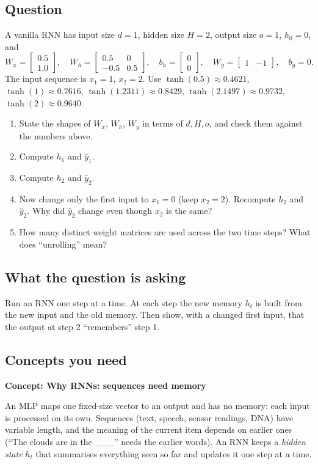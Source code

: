 \documentclass[12pt,a4paper]{article}
\newcommand{\concept}[2]{\par\medskip\phantomsection\label{#1}{\large\bfseries\color{blue!50!black} Concept: #2}\par}
\begin{document}
\subsection*{Question}
A vanilla RNN has input size $d=1$, hidden size $H=2$, output size $o=1$, $h_0=0$, and
\[
W_x=\begin{bmatrix}0.5\\1.0\end{bmatrix},\quad W_h=\begin{bmatrix}0.5&0\\-0.5&0.5\end{bmatrix},\quad b_h=\begin{bmatrix}0\\0\end{bmatrix},\quad W_y=\begin{bmatrix}1&-1\end{bmatrix},\quad b_y=0 .
\]
The input sequence is $x_1=1$, $x_2=2$. Use $\tanh(0.5)\approx0.4621$, $\tanh(1)\approx0.7616$, $\tanh(1.2311)\approx0.8429$, $\tanh(2.1497)\approx0.9732$, $\tanh(2)\approx0.9640$.
\begin{enumerate}[label=(\alph*)]
\item State the shapes of $W_x$, $W_h$, $W_y$ in terms of $d,H,o$, and check them against the numbers above.
\item Compute $h_1$ and $\hat y_1$.
\item Compute $h_2$ and $\hat y_2$.
\item Now change only the first input to $x_1=0$ (keep $x_2=2$). Recompute $h_2$ and $\hat y_2$. Why did $\hat y_2$ change even though $x_2$ is the same?
\item How many distinct weight matrices are used across the two time steps? What does ``unrolling'' mean?
\end{enumerate}

\subsection*{What the question is asking}
Run an RNN one step at a time. At each step the new memory $h_t$ is built from the new input and the old memory. Then show, with a changed first input, that the output at step 2 ``remembers'' step 1.

\subsection*{Concepts you need}

\concept{c:whyrnn}{Why RNNs: sequences need memory}
An MLP maps one fixed-size vector to an output and has no memory: each input is processed on its own. Sequences (text, speech, sensor readings, DNA) have variable length, and the meaning of the current item depends on earlier ones (``The clouds are in the \_\_\_'' needs the earlier words). An RNN keeps a \emph{hidden state} $h_t$ that summarises everything seen so far and updates it one step at a time.
\end{document}

